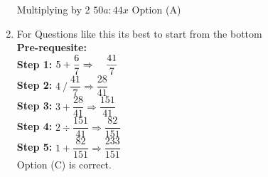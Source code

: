 \begin{multicols}{2}
\begin{enumerate}[label={\arabic*.}]
    Multiplying by 2 \hspace{10px} \(50a : 44x\) \hspace{5px}Option (A)
    \[\]
    \item For Questions like this its best to start from the bottom \\
    \textbf{Pre-requesite:} \\
     \textbf{Step 1:} \hspace{10px}\( 5 + \dfrac{6}{7} \Rightarrow \hspace{10px} \dfrac{41}{7}\) \vspace{5px} \\
     \textbf{Step 2:} \hspace{10px}\(4 \mathbin{/} \dfrac{41}{7} \Rightarrow \dfrac{28}{41}  \) \vspace{5px} \\
     \textbf{Step 3:} \hspace{10px}\(3 + \dfrac{28}{41} \Rightarrow \dfrac{151}{41}\) \vspace{5px}\\
     \textbf{Step 4:} \hspace{10px}\(2 ÷ \dfrac{151}{41} \Rightarrow \dfrac{82}{151}\) \vspace{5px} \\
     \textbf{Step 5:} \hspace{10px} \( 1 + \dfrac{82}{151} \Rightarrow \dfrac{233}{151}\) \\
    Option (C) is correct.
    

\end{enumerate}
\end{multicols}
